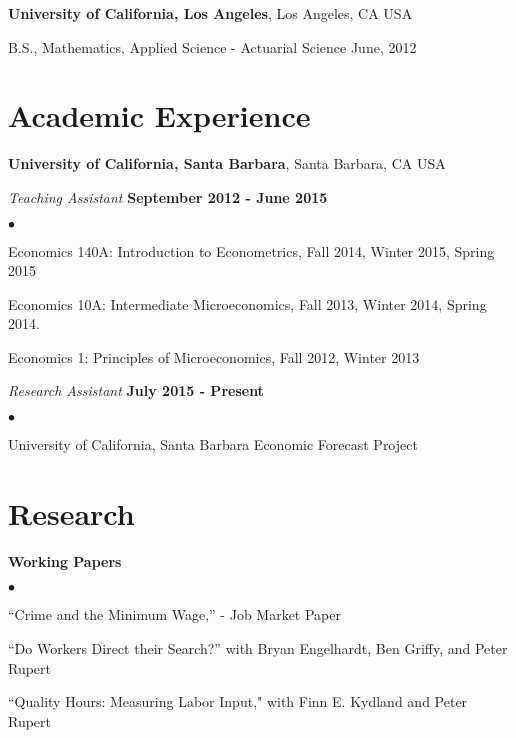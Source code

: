 \documentclass[margin,line]{res}
\newenvironment{list1}{
  \begin{list}{\ding{113}}{%
      \setlength{\itemsep}{0.05in}
      \setlength{\parsep}{0in} \setlength{\parskip}{0in}
      \setlength{\topsep}{0in} \setlength{\partopsep}{0in}
      \setlength{\leftmargin}{0.17in}}}{\end{list}}
\newenvironment{list2}{
  \begin{list}{$\bullet$}{%
      \setlength{\itemsep}{0.05in}
      \setlength{\parsep}{0in} \setlength{\parskip}{0in}
      \setlength{\topsep}{0in} \setlength{\partopsep}{0in} 
      \setlength{\leftmargin}{0.2in}}}{\end{list}}
\begin{document}
\begin{resume}
{\bf University of California, Los Angeles}, Los Angeles, CA USA\\

\vspace*{-.1in}
\begin{list1}
\item[] B.S., Mathematics, Applied Science - Actuarial Science  June, 2012
\end{list1}

\section{\sc Academic Experience}
{\bf University of California, Santa Barbara}, Santa Barbara, CA USA

{\em Teaching Assistant} \hfill {\bf September 2012 - June 2015}\vspace{0.1em}\\
\begin{list2}
\item Economics 140A: Introduction to Econometrics, Fall 2014, Winter 2015, Spring 2015
\item Economics 10A: Intermediate Microeconomics, Fall 2013, Winter 2014, Spring 2014.
\item Economics 1: Principles of Microeconomics, Fall 2012, Winter 2013
\end{list2}

{\em Research Assistant} \hfill {\bf July 2015 - Present}\vspace{0.02in}\\
\begin{list2}
\item University of California, Santa Barbara Economic Forecast Project
\end{list2}

\section{\sc Research}
{\bf Working Papers}\vspace{0.1em}\\
\begin{list2}
\item ``Crime and the Minimum Wage,''  - Job Market Paper
\item ``Do Workers Direct their Search?'' with Bryan Engelhardt, Ben Griffy, and Peter Rupert
\item ``Quality Hours: Measuring Labor Input,"  with Finn E. Kydland and Peter Rupert
\end{list2}


\end{resume}
\end{document}
